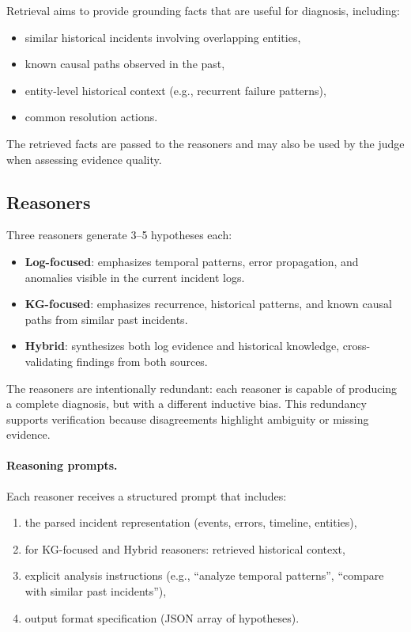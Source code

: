 Retrieval aims to provide grounding facts that are useful for diagnosis, including:
\begin{itemize}
  \item similar historical incidents involving overlapping entities,
  \item known causal paths observed in the past,
  \item entity-level historical context (e.g., recurrent failure patterns),
  \item common resolution actions.
\end{itemize}
The retrieved facts are passed to the reasoners and may also be used by the judge when assessing
evidence quality.

\subsection{Reasoners}
Three reasoners generate 3--5 hypotheses each:
\begin{itemize}
  \item \textbf{Log-focused}: emphasizes temporal patterns, error propagation, and anomalies
        visible in the current incident logs.
  \item \textbf{KG-focused}: emphasizes recurrence, historical patterns, and known causal paths
        from similar past incidents.
  \item \textbf{Hybrid}: synthesizes both log evidence and historical knowledge, cross-validating
        findings from both sources.
\end{itemize}

The reasoners are intentionally redundant: each reasoner is capable of producing a complete
diagnosis, but with a different inductive bias. This redundancy supports verification because
disagreements highlight ambiguity or missing evidence.

\paragraph{Reasoning prompts.}
Each reasoner receives a structured prompt that includes:
\begin{enumerate}
  \item the parsed incident representation (events, errors, timeline, entities),
  \item for KG-focused and Hybrid reasoners: retrieved historical context,
  \item explicit analysis instructions (e.g., ``analyze temporal patterns'', ``compare with
        similar past incidents''),
  \item output format specification (JSON array of hypotheses).
\end{enumerate}

